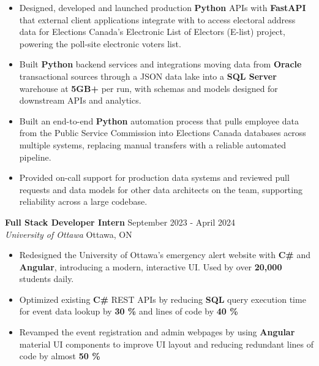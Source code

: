 \documentclass[a4paper]{article}
\begin{document}
\begin{itemize}
\item Designed, developed and launched production \textbf{Python} APIs with \textbf{FastAPI} that external client applications integrate with to access electoral address data for Elections Canada's Electronic List of Electors (E-list) project, powering the poll-site electronic voters list.

\item Built \textbf{Python} backend services and integrations moving data from \textbf{Oracle} transactional sources through a JSON data lake into a \textbf{SQL Server} warehouse at \textbf{5GB+} per run, with schemas and models designed for downstream APIs and analytics.

\item Built an end-to-end \textbf{Python} automation process that pulls employee data from the Public Service Commission into Elections Canada databases across multiple systems, replacing manual transfers with a reliable automated pipeline.

\item Provided on-call support for production data systems and reviewed pull requests and data models for other data architects on the team, supporting reliability across a large codebase.

\end{itemize}

\textbf{Full Stack Developer Intern } \hfill September 2023 - April 2024\\
\textit{University of Ottawa} \hfill Ottawa, ON\\
\vspace{-2mm}
\begin{itemize} \itemsep -4pt
    \item Redesigned the University of Ottawa's emergency alert website with \textbf{C\#} and \textbf{Angular}, introducing a modern, interactive UI. Used by over \textbf{20,000} students daily.
     \item Optimized existing \textbf{C\#} REST APIs by reducing \textbf{SQL} query execution time for event data lookup by \textbf{30 \%} and lines of code by \textbf{40 \%}
    \item Revamped the event registration and admin webpages by using \textbf{Angular} material UI components to improve UI layout and reducing redundant lines of code by almost \textbf{50 \%}
\end{itemize}
\end{document}
